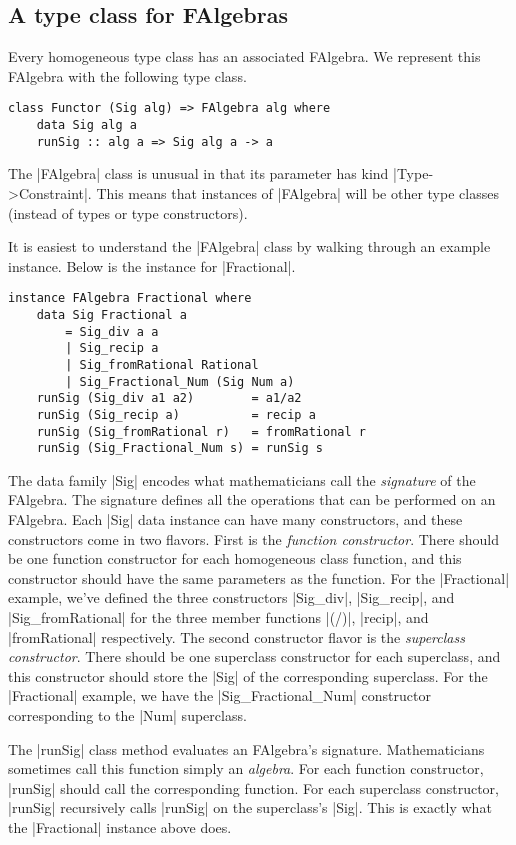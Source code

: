 \documentclass[preprint]{sigplanconf}
\theoremstyle{definition}
\begin{document}
\subsection{A type class for FAlgebras}
Every homogeneous type class has an associated FAlgebra.
We represent this FAlgebra with the following type class.
\begin{lstlisting}
class Functor (Sig alg) => FAlgebra alg where
    data Sig alg a
    runSig :: alg a => Sig alg a -> a
\end{lstlisting}
The |FAlgebra| class is unusual in that its parameter has kind |Type->Constraint|.
This means that instances of |FAlgebra| will be other type classes
(instead of types or type constructors).

It is easiest to understand the |FAlgebra| class by walking through an example instance.
Below is the instance for |Fractional|.
\begin{lstlisting}
instance FAlgebra Fractional where
    data Sig Fractional a
        = Sig_div a a
        | Sig_recip a
        | Sig_fromRational Rational
        | Sig_Fractional_Num (Sig Num a)
    runSig (Sig_div a1 a2)        = a1/a2
    runSig (Sig_recip a)          = recip a
    runSig (Sig_fromRational r)   = fromRational r
    runSig (Sig_Fractional_Num s) = runSig s
\end{lstlisting}

The data family |Sig| encodes what mathematicians call the \emph{signature} of the FAlgebra.
The signature defines all the operations that can be performed on an FAlgebra.
Each |Sig| data instance can have many constructors,
and these constructors come in two flavors.
First is the \emph{function constructor}.
There should be one function constructor for each homogeneous class function, and
this constructor should have the same parameters as the function.
For the |Fractional| example, we've defined the three constructors |Sig_div|, |Sig_recip|, and |Sig_fromRational| for the three member functions |(/)|, |recip|, and |fromRational| respectively.
The second constructor flavor is the \emph{superclass constructor}.
There should be one superclass constructor for each superclass, and
this constructor should store the |Sig| of the corresponding superclass.
For the |Fractional| example, we have the |Sig_Fractional_Num| constructor corresponding to the |Num| superclass.

The |runSig| class method evaluates an FAlgebra's signature.
Mathematicians sometimes call this function simply an \emph{algebra}.
For each function constructor, |runSig| should call the corresponding function.
For each superclass constructor, |runSig| recursively calls |runSig| on the superclass's |Sig|.
This is exactly what the |Fractional| instance above does.
\end{document}
